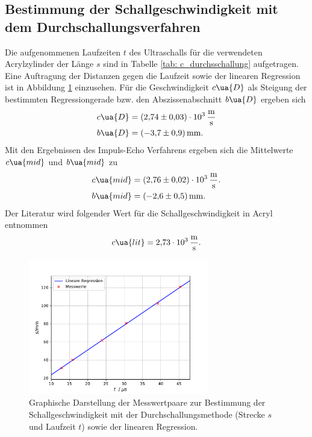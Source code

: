\subsection{Bestimmung der Schallgeschwindigkeit mit dem Durchschallungsverfahren}
Die aufgenommenen Laufzeiten $t$ des Ultraschalls für die verwendeten Acrylzylinder der Länge $s$ sind
in Tabelle \ref{tab: c_durchsschallung} aufgetragen. Eine Auftragung der Distanzen gegen die Laufzeit sowie
der linearen Regression ist in Abbildung \ref{fig: c_durchschallung} einzusehen. Für die Geschwindigkeit $c\ua{D}$ %
als Steigung der bestimmten Regressiongerade bzw. den Abszissenabschnitt $b\ua{D}$ ergeben sich
\begin{align}
  \begin{aligned}
    c\ua{D} &= \SI{+2.74(3)e+03}{\meter\per\second}\\
    b\ua{D} &= \SI{-3.7(9)}{\milli\meter}.
  \end{aligned}
\end{align}
Mit den Ergebnissen des Impuls-Echo Verfahrens ergeben sich die Mittelwerte $c\ua{mid}$ und $b\ua{mid}$ zu
\begin{align}
  \begin{aligned}
  c\ua{mid} &= \SI{+2.76(2)e+03}{\meter\per\second}. \\
  b\ua{mid} &= \SI{-2.6(5)}{\milli\meter}.
\end{aligned}
\end{align}
Der Literatur \cite{olympus} wird folgender Wert für die Schallgeschwindigkeit in Acryl entnommen
\begin{equation}
  c\ua{lit} = \SI{2.73e3}{\meter\per\second}.
  \label{eq: c_lit}
\end{equation}


\begin{figure}[H]
  \centering
  \includegraphics[width = 0.7\textwidth]{../Messdaten/plots/schallgeschwindigkeit_durchschallung.pdf}
  \caption{Graphische Darstellung der Messwertpaare zur Bestimmung der Schallgeschwindigkeit
  mit der Durchschallungsmethode (Strecke $s$ und Laufzeit $t$) sowie der linearen Regression.}
  \label{fig: c_durchschallung}
\end{figure}

